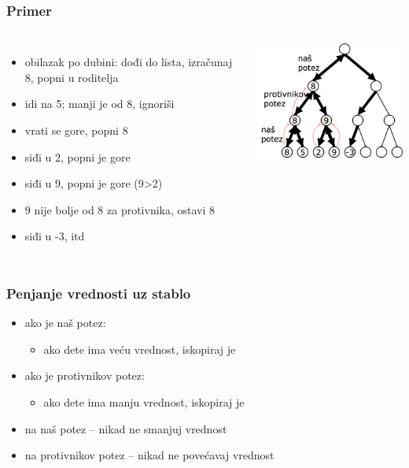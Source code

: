 \documentclass[compress,aspectratio=169]{beamer}
\begin{document}
\begin{frame}[fragile]
  \frametitle{Primer}
  \begin{columns}
    \column{8cm}
    \begin{itemize}
      \item obilazak po dubini: dođi do lista, izračunaj 8, popni u roditelja
      \item idi na 5; manji je od 8, ignoriši
      \item vrati se gore, popni 8
      \item siđi u 2, popni je gore
      \item siđi u 9, popni je gore (9>2)
      \item 9 nije bolje od 8 za protivnika, ostavi 8
      \item siđi u -3, itd
    \end{itemize}
    \column{8cm}
    \begin{center}
      \includegraphics[width=7cm]{prj-01-pic10.png}
    \end{center}
  \end{columns}
\end{frame}

\begin{frame}[fragile]
  \frametitle{Penjanje vrednosti uz stablo}
  \begin{itemize}
    \item ako je naš potez:
    \begin{itemize}
      \item ako dete ima veću vrednost, iskopiraj je
    \end{itemize}
    \item ako je protivnikov potez:
    \begin{itemize}
      \item ako dete ima manju vrednost, iskopiraj je
    \end{itemize}
    \item na naš potez -- nikad ne smanjuj vrednost
    \item na protivnikov potez -- nikad ne povećavaj vrednost
  \end{itemize}
\end{frame}
\end{document}
